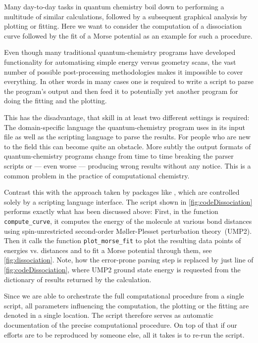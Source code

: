 Many day-to-day tasks in quantum chemistry boil down to
performing a multitude of similar calculations,
followed by a subsequent graphical analysis
by plotting or fitting.
Here we want to consider the computation of a dissociation curve
followed by the fit of a Morse potential
as an example for such a procedure.

Even though many traditional quantum-chemistry programs
have developed functionality for automatising simple
energy versus geometry scans,
the vast number of possible post-processing methodologies
makes it impossible to cover everything.
In other words in many cases one is required to write a script
to parse the program's output and then feed it to potentially yet
another program for doing the fitting and the plotting.

This has the disadvantage,
that skill in at least two different settings is required:
The domain-specific language the quantum-chemistry program uses
in its input file as well as the scripting language to parse the results.
For people who are new to the field this can become quite an obstacle.
More subtly the output formats
of quantum-chemistry programs change from time to time
breaking the parser scripts or --- even worse ---
producing wrong results without any notice.
This is a common problem in the practice of computational chemistry.

Contrast this with the approach taken by packages like \molsturm,
which are controlled solely by a scripting language interface.
The \python script shown in \fig \ref{fig:codeDissociation} performs
exactly what has been discussed above:
First, in the function \texttt{compute\_curve},
it computes the energy of the  molecule
at various bond distances using spin-unrestricted
second-order Møller-Plesset perturbation theory~(UMP2).
Then it calls the function \texttt{plot\_morse\_fit}
to plot the resulting data points of energies vs. distances
and to fit a Morse potential through them,
see \fig \ref{fig:dissociation}.
Note, how the error-prone parsing step is replaced by just
line \lextract of \fig \ref{fig:codeDissociation},
where UMP2 ground state energy is requested from the
dictionary of results returned by the calculation.

Since we are able to orchestrate the full computational procedure
from a single script,
all parameters influencing the computation, the plotting or the fitting
are denoted in a single location.
The script therefore serves as automatic documentation
of the precise computational procedure.
On top of that if our efforts are to be reproduced by someone else,
all it takes is to re-run the script.

